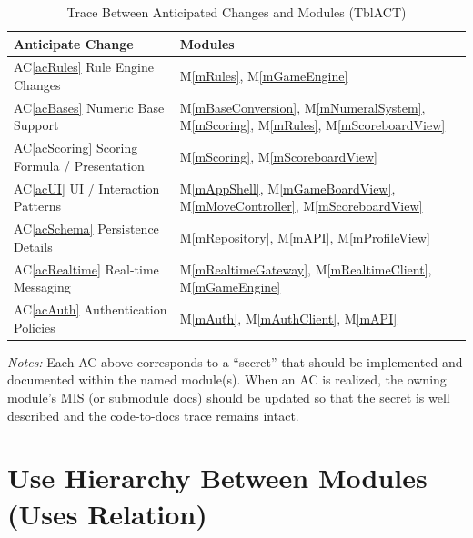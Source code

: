 \documentclass[12pt, titlepage]{article}
\newcommand{\acref}[1]{AC\ref{#1}}
\newcommand{\mref}[1]{M\ref{#1}}
\begin{document}
\begin{table}[H]
\centering
\caption{Trace Between Anticipated Changes and Modules (TblACT)}
\label{TblACT}
\begin{tabularx}{\textwidth}{p{} X}
\toprule
\textbf{Anticipate Change} & \textbf{Modules} \\
\midrule
\acref{acRules} Rule Engine Changes & \mref{mRules}, \mref{mGameEngine} \\
\acref{acBases} Numeric Base Support & \mref{mBaseConversion}, \mref{mNumeralSystem}, \mref{mScoring}, \mref{mRules}, \mref{mScoreboardView} \\
\acref{acScoring} Scoring Formula / Presentation & \mref{mScoring}, \mref{mScoreboardView} \\
\acref{acUI} UI / Interaction Patterns & \mref{mAppShell}, \mref{mGameBoardView}, \mref{mMoveController}, \mref{mScoreboardView} \\
\acref{acSchema} Persistence Details & \mref{mRepository}, \mref{mAPI}, \mref{mProfileView} \\
\acref{acRealtime} Real-time Messaging & \mref{mRealtimeGateway}, \mref{mRealtimeClient}, \mref{mGameEngine} \\
\acref{acAuth} Authentication Policies & \mref{mAuth}, \mref{mAuthClient}, \mref{mAPI} \\
\bottomrule
\end{tabularx}
\end{table}

\noindent\textit{Notes:} Each AC above corresponds to a ``secret'' that should be implemented and documented within the named module(s).  When an AC is realized, the owning module's MIS (or submodule docs) should be updated so that the secret is well described and the code-to-docs trace remains intact.


\section{Use Hierarchy Between Modules (Uses Relation)} \label{SecUse}
\end{document}
